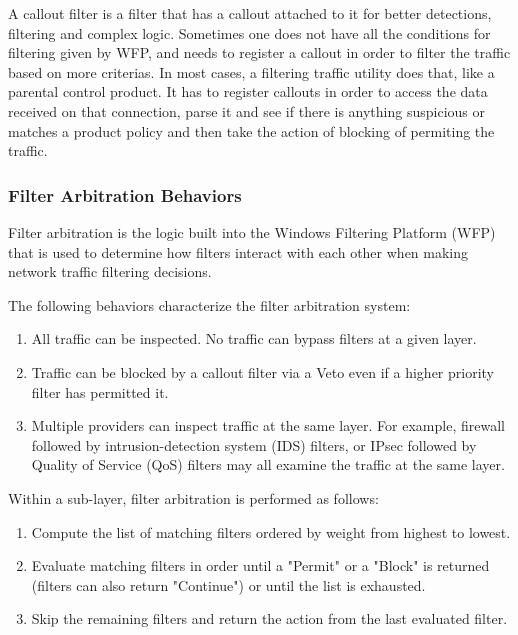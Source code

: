 A callout filter is a filter that has a callout attached to it for better detections, filtering and complex logic. Sometimes one does not have all the conditions for filtering given by WFP, and needs to register a callout in order to filter the traffic based on more criterias.  In most cases, a filtering traffic utility does that, like a parental control product. It has to register callouts in order to access the data received on that connection, parse it and see if there is anything suspicious or matches a product policy and then take the action of blocking of permiting the traffic. 

\vspace{5mm}
\subsubsection{Filter Arbitration Behaviors}
\vspace{5mm}

Filter arbitration is the logic built into the Windows Filtering Platform (WFP) that is used to determine how filters interact with each other when making network traffic filtering decisions.

\vspace{5mm}
The following behaviors characterize the filter arbitration system:
\vspace{5mm}

\begin{enumerate}
\item All traffic can be inspected. No traffic can bypass filters at a given layer.
\item Traffic can be blocked by a callout filter via a Veto even if a higher priority filter has permitted it.
\item Multiple providers can inspect traffic at the same layer. For example, firewall followed by intrusion-detection system (IDS) filters, or IPsec followed by Quality of Service (QoS) filters may all examine the traffic at the same layer.
\end{enumerate}
\vspace{5mm}

Within a sub-layer, filter arbitration is performed as follows:

\vspace{5mm}
\begin{enumerate}
\item Compute the list of matching filters ordered by weight from highest to lowest.
\item Evaluate matching filters in order until a "Permit" or a "Block" is returned (filters can also return "Continue") or until the list is exhausted.
\item Skip the remaining filters and return the action from the last evaluated filter.
\end{enumerate}

